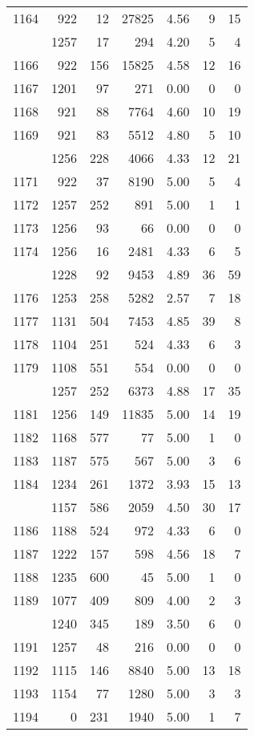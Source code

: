\documentclass[
]{article}
\begin{document}
\begin{table}
\begin{tabular}[t]{lrrrrrr}
1164 & 922 & 12 & 27825 & 4.56 & 9 & 15\\
\addlinespace
1165 & 1257 & 17 & 294 & 4.20 & 5 & 4\\
1166 & 922 & 156 & 15825 & 4.58 & 12 & 16\\
1167 & 1201 & 97 & 271 & 0.00 & 0 & 0\\
1168 & 921 & 88 & 7764 & 4.60 & 10 & 19\\
1169 & 921 & 83 & 5512 & 4.80 & 5 & 10\\
\addlinespace
1170 & 1256 & 228 & 4066 & 4.33 & 12 & 21\\
1171 & 922 & 37 & 8190 & 5.00 & 5 & 4\\
1172 & 1257 & 252 & 891 & 5.00 & 1 & 1\\
1173 & 1256 & 93 & 66 & 0.00 & 0 & 0\\
1174 & 1256 & 16 & 2481 & 4.33 & 6 & 5\\
\addlinespace
1175 & 1228 & 92 & 9453 & 4.89 & 36 & 59\\
1176 & 1253 & 258 & 5282 & 2.57 & 7 & 18\\
1177 & 1131 & 504 & 7453 & 4.85 & 39 & 8\\
1178 & 1104 & 251 & 524 & 4.33 & 6 & 3\\
1179 & 1108 & 551 & 554 & 0.00 & 0 & 0\\
\addlinespace
1180 & 1257 & 252 & 6373 & 4.88 & 17 & 35\\
1181 & 1256 & 149 & 11835 & 5.00 & 14 & 19\\
1182 & 1168 & 577 & 77 & 5.00 & 1 & 0\\
1183 & 1187 & 575 & 567 & 5.00 & 3 & 6\\
1184 & 1234 & 261 & 1372 & 3.93 & 15 & 13\\
\addlinespace
1185 & 1157 & 586 & 2059 & 4.50 & 30 & 17\\
1186 & 1188 & 524 & 972 & 4.33 & 6 & 0\\
1187 & 1222 & 157 & 598 & 4.56 & 18 & 7\\
1188 & 1235 & 600 & 45 & 5.00 & 1 & 0\\
1189 & 1077 & 409 & 809 & 4.00 & 2 & 3\\
\addlinespace
1190 & 1240 & 345 & 189 & 3.50 & 6 & 0\\
1191 & 1257 & 48 & 216 & 0.00 & 0 & 0\\
1192 & 1115 & 146 & 8840 & 5.00 & 13 & 18\\
1193 & 1154 & 77 & 1280 & 5.00 & 3 & 3\\
1194 & 0 & 231 & 1940 & 5.00 & 1 & 7\\

\end{tabular}
\end{table}
\end{document}
